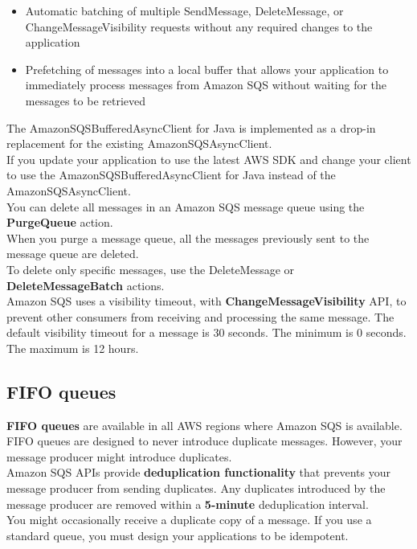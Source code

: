 \documentclass[12pt, letterpaper, twoside]{article}
\begin{document}
\begin{itemize}
	\item Automatic batching of multiple SendMessage, DeleteMessage, or ChangeMessageVisibility requests without any 
		required changes to the application
	\item Prefetching of messages into a local buffer that allows your application to immediately process messages 
		from Amazon SQS without waiting for the messages to be retrieved
\end{itemize}

The AmazonSQSBufferedAsyncClient for Java is implemented as a drop-in replacement for the existing AmazonSQSAsyncClient.\\
If you update your application to use the latest AWS SDK and change your client to use the AmazonSQSBufferedAsyncClient 
for Java instead of the AmazonSQSAsyncClient.\\

You can delete all messages in an Amazon SQS message queue using the \textbf{PurgeQueue} action.\\
When you purge a message queue, all the messages previously sent to the message queue are deleted.\\
To delete only specific messages, use the DeleteMessage or \textbf{DeleteMessageBatch} actions.\\

Amazon SQS uses a visibility timeout, with \textbf{ChangeMessageVisibility} API, to prevent other consumers from receiving and 
processing the same message. The default visibility timeout for a message is 30 seconds. The minimum is 0 seconds. 
The maximum is 12 hours.



\subsection{FIFO queues}
\textbf{FIFO queues} are available in all AWS regions where Amazon SQS is available.\\
FIFO queues are designed to never introduce duplicate messages. However, your message producer might introduce duplicates.\\
Amazon SQS APIs provide \textbf{deduplication functionality} that prevents your message producer from sending duplicates. 
Any duplicates introduced by the message producer are removed within a \textbf{5-minute} deduplication interval.\\

You might occasionally receive a duplicate copy of a message. If you use a standard queue, you must design your applications 
to be idempotent.\\
\end{document}
